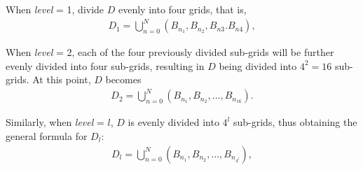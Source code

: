 \documentclass[5GeSdc,ASOC,numref,printGA,printHL,CASflow,nocrossmark,longtitle,PROOF]{/usr/local/texlive/iTemplates/01-Templates/01-Els-Jnl/01-Standard_Templates/V1/ELS_MDL5-V1-6}
\begin{document}
\begin{articlestyle}
When \textit{level} = 1, divide $ D $ evenly into four grids, that is,  
\begin{align*}  
D_1 = \bigcup_{n=0}^{N} (B_{n_1}, B_{n_2}, B_{n3}. B_{n4}),  
\end{align*}  

When \textit{level} = 2, each of the four previously divided sub-grids will be further evenly divided into four sub-grids, resulting in $ D $ being divided into $ 4^2 = 16 $ sub-grids. At this point, $ D $ becomes  
\begin{align*}  
D_2 = \bigcup_{n=0}^{N} (B_{n_1}, B_{n_2}, \ldots, B_{n_{16}}).
\end{align*}  

Similarly, when \textit{level} = $ l $, $ D $ is evenly divided into $ 4^l $ sub-grids, thus obtaining the general formula for $ D_l $:  
\begin{align*}  
D_l = \bigcup_{n=0}^{N} (B_{n_1}, B_{n_2}, \ldots, B_{n_{4^l}}),  
\end{align*}  


\end{articlestyle}
\end{document}
